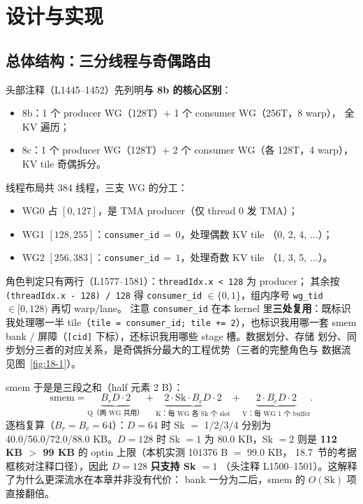 \section{设计与实现}

\subsection{总体结构：三分线程与奇偶路由}

头部注释（L1445--1452）先列明\textbf{与 8b 的核心区别}：

\begin{itemize}
  \item 8b：1 个 producer WG（128T）$+$ 1 个 consumer WG（256T，8 warp），
        全 KV 遍历；
  \item 8c：1 个 producer WG（128T）$+$ 2 个 consumer WG（各 128T，4 warp），
        KV tile 奇偶拆分。
\end{itemize}

线程布局共 384 线程，三支 WG 的分工：

\begin{itemize}
  \item WG0 占 $[0,127]$，是 TMA producer（仅 thread 0 发 TMA）；
  \item WG1 $[128,255]$：\texttt{consumer\_id}$\,{=}\,0$，处理偶数 KV tile
        （0, 2, 4, $\dots$）；
  \item WG2 $[256,383]$：\texttt{consumer\_id}$\,{=}\,1$，处理奇数 KV tile
        （1, 3, 5, $\dots$）。
\end{itemize}

角色判定只有两行（L1577--1581）：\texttt{threadIdx.x < 128} 为 producer；
其余按 \texttt{\allowbreak{}(thread\allowbreak{}Idx.\allowbreak{}x - 128) /\allowbreak{} 128} 得 \texttt{consumer\_id}
$\in \{0, 1\}$，组内序号 \texttt{wg\_tid} $\in [0, 128)$ 再切 warp/lane。
注意 \texttt{consumer\_id} 在本 kernel 里\textbf{三处复用}：既标识我处理哪一半
tile（\texttt{tile =\allowbreak{} consumer\_\allowbreak{}id; tile +=\allowbreak{} 2}），也标识我用哪一套 smem
bank / 屏障（\texttt{[cid]} 下标），还标识我用哪些 stage 槽。数据划分、存储
划分、同步划分三者的对应关系，是奇偶拆分最大的工程优势（三者的完整角色与
数据流见图~\ref{fig:18-1}）。



smem 于是是三段之和（half 元素 2 B）：
\begin{equation}
  \mathrm{smem} = \underbrace{B_r D \cdot 2}_{\text{Q（两 WG 共用）}}
  + \underbrace{2 \cdot \mathrm{Sk} \cdot B_c D \cdot 2}_{\text{K：每 WG 各 Sk 个 slot}}
  + \underbrace{2 \cdot B_c D \cdot 2}_{\text{V：每 WG 1 个 buffer}} .
  \label{eq:18-smem}
\end{equation}
逐档复算（$B_r = B_c = 64$）：$D{=}64$ 时 Sk $=$ 1/2/3/4 分别为
40.0/56.0/72.0/88.0 KB。$D{=}128$ 时 Sk $=1$ 为 80.0 KB，Sk $=2$ 则是
\textbf{112 KB $>$ 99 KB} 的 optin 上限（本机实测 101376 B $=$ 99.0 KB，
18.7~节的考据框核对注释口径），因此 $D{=}128$ \textbf{只支持 Sk $= 1$}
（头注释 L1500--1501）。这解释了为什么更深流水在本章并非没有代价：
bank 一分为二后，smem 的 $O(\mathrm{Sk})$ 项直接翻倍。

